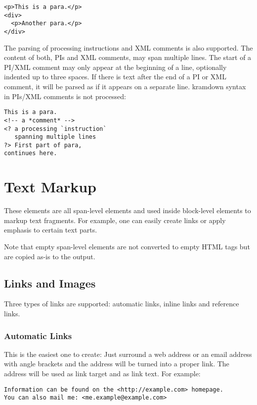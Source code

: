 \documentclass[a4paper]{article}
\begin{document}
\begin{verbatim}
<p>This is a para.</p>
<div>
  <p>Another para.</p>
</div>
\end{verbatim}

The parsing of processing instructions and XML comments is also
supported. The content of both, PIs and XML comments, may span multiple
lines. The start of a PI/XML comment may only appear at the beginning of
a line, optionally indented up to three spaces. If there is text after
the end of a PI or XML comment, it will be parsed as if it appears on a
separate line. kramdown syntax in PIs/XML comments is not processed:

\begin{verbatim}
This is a para.
<!-- a *comment* -->
<? a processing `instruction`
   spanning multiple lines
?> First part of para,
continues here.
\end{verbatim}

\hypertarget{text-markup}{\section{Text Markup}\label{text-markup}}

These elements are all span-level elements and used inside block-level
elements to markup text fragments. For example, one can easily create
links or apply emphasis to certain text parts.

Note that empty span-level elements are not converted to empty HTML tags
but are copied as-is to the output.

\hypertarget{links-and-images}{\subsection{Links and
Images}\label{links-and-images}}

Three types of links are supported: automatic links, inline links and
reference links.

\hypertarget{automatic-links}{\subsubsection{Automatic
Links}\label{automatic-links}}

This is the easiest one to create: Just surround a web address or an
email address with angle brackets and the address will be turned into a
proper link. The address will be used as link target and as link text.
For example:

\begin{verbatim}
Information can be found on the <http://example.com> homepage.
You can also mail me: <me.example@example.com>
\end{verbatim}
\end{document}
